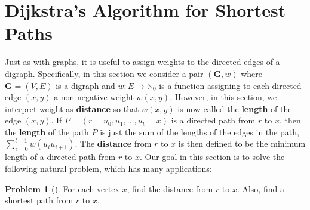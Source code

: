 \documentclass[10pt,]{book}
\newcommand{\terminology}[1]{\textbf{#1}}
\theoremstyle{plain}
\theoremstyle{definition}
\theoremstyle{definition}
\theoremstyle{definition}
\newtheorem{problem}[theorem]{Problem}
\theoremstyle{definition}
\numberwithin{equation}{section}
\newcommand{\nonnegints}{\mathbb{N}_0}
\newcommand{\GVE}{\mathbf{G}=(V,E)}
\newcommand{\bfG}{\mathbf{G}}
\begin{document}
\section[{Dijkstra's Algorithm for Shortest Paths}]{Dijkstra's Algorithm for Shortest Paths}\label{s_graphalgorithms_shortest-paths}
\hypertarget{p-196}{}%
Just as with graphs, it is useful to assign weights to the directed edges of a digraph. Specifically, in this section we consider a pair \((\bfG,w)\) where \(\GVE\) is a digraph and \(w\colon E\rightarrow\nonnegints\) is a function assigning to each directed edge \((x,y)\) a non-negative weight \(w(x,y)\). However, in this section, we interpret weight as \terminology{distance} so that \(w(x,y)\) is now called the \terminology{length} of the edge \((x,y)\). If \(P=(r=u_0,u_1,\dots,u_t=x)\) is a directed path from \(r\) to \(x\), then the \terminology{length} of the path \(P\) is just the sum of the lengths of the edges in the path, \(\sum_{i=0}^{t-1} w(u_iu_{i+1})\). The \terminology{distance} from \(r\) to \(x\) is then defined to be the minimum length of a directed path from \(r\) to \(x\). Our goal in this section is to solve the following natural problem, which has many applications:%
\begin{problem}[]\label{problem-2}
\hypertarget{p-197}{}%
For each vertex \(x\), find the distance from \(r\) to \(x\). Also, find a shortest path from \(r\) to \(x\).%
\end{problem}
\typeout{************************************************}
\typeout{************************************************}
\end{document}
